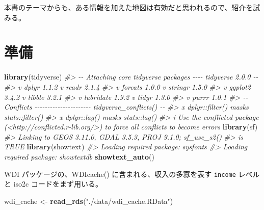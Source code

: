 \documentclass[
  xelatex, ja=standard]{bxjsbook}
\newenvironment{Shaded}{\begin{snugshade}}{\end{snugshade}}
\newcommand{\CommentTok}[1]{\textcolor[rgb]{0.56,0.35,0.01}{\textit{#1}}}
\newcommand{\FunctionTok}[1]{\textcolor[rgb]{0.13,0.29,0.53}{\textbf{#1}}}
\newcommand{\NormalTok}[1]{#1}
\newcommand{\OtherTok}[1]{\textcolor[rgb]{0.56,0.35,0.01}{#1}}
\newcommand{\StringTok}[1]{\textcolor[rgb]{0.31,0.60,0.02}{#1}}
\theoremstyle{definition}
\theoremstyle{definition}
\theoremstyle{definition}
\theoremstyle{definition}
\theoremstyle{remark}
\begin{document}
本書のテーマからも、ある情報を加えた地図は有効だと思われるので、紹介を試みる。

\hypertarget{ux6e96ux5099}{%
\section{準備}\label{ux6e96ux5099}}

\begin{Shaded}
\begin{Highlighting}[]
\FunctionTok{library}\NormalTok{(tidyverse)}
\CommentTok{\#\textgreater{} {-}{-} Attaching core tidyverse packages {-}{-}{-}{-} tidyverse 2.0.0 {-}{-}}
\CommentTok{\#\textgreater{} v dplyr     1.1.2     v readr     2.1.4}
\CommentTok{\#\textgreater{} v forcats   1.0.0     v stringr   1.5.0}
\CommentTok{\#\textgreater{} v ggplot2   3.4.2     v tibble    3.2.1}
\CommentTok{\#\textgreater{} v lubridate 1.9.2     v tidyr     1.3.0}
\CommentTok{\#\textgreater{} v purrr     1.0.1     }
\CommentTok{\#\textgreater{} {-}{-} Conflicts {-}{-}{-}{-}{-}{-}{-}{-}{-}{-}{-}{-}{-}{-}{-}{-}{-}{-}{-}{-}{-}{-} tidyverse\_conflicts() {-}{-}}
\CommentTok{\#\textgreater{} x dplyr::filter() masks stats::filter()}
\CommentTok{\#\textgreater{} x dplyr::lag()    masks stats::lag()}
\CommentTok{\#\textgreater{} i Use the conflicted package (\textless{}http://conflicted.r{-}lib.org/\textgreater{}) to force all conflicts to become errors}
\FunctionTok{library}\NormalTok{(sf)}
\CommentTok{\#\textgreater{} Linking to GEOS 3.11.0, GDAL 3.5.3, PROJ 9.1.0; sf\_use\_s2()}
\CommentTok{\#\textgreater{} is TRUE}
\FunctionTok{library}\NormalTok{(showtext)}
\CommentTok{\#\textgreater{} Loading required package: sysfonts}
\CommentTok{\#\textgreater{} Loading required package: showtextdb}
\FunctionTok{showtext\_auto}\NormalTok{()}
\end{Highlighting}
\end{Shaded}

WDI パッケージの、WDIcache() に含まれる、収入の多寡を表す \texttt{income} レベルと iso2c コードをまず用いる。

\begin{Shaded}
\begin{Highlighting}[]
\NormalTok{wdi\_cache }\OtherTok{\textless{}{-}} \FunctionTok{read\_rds}\NormalTok{(}\StringTok{"./data/wdi\_cache.RData"}\NormalTok{)}
\end{Highlighting}
\end{Shaded}
\end{document}
